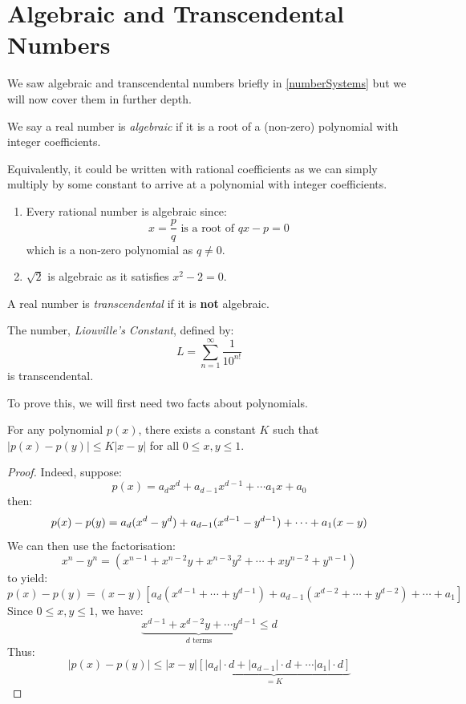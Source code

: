 \documentclass[../main.tex]{subfiles}
\begin{document}
\section{Algebraic and Transcendental Numbers}
We saw algebraic and transcendental numbers briefly in \cref{numberSystems} but we will now cover them in further depth.
\begin{definition}
  We say a real number is \textit{algebraic} if it is a root of a (non-zero) polynomial with integer coefficients.
\end{definition}
\begin{remark}[Note]
  Equivalently, it could be written with rational coefficients as we can simply multiply by some constant to arrive at a polynomial with integer coefficients.
\end{remark}
\begin{example}
  \begin{enumerate}
    \item Every rational number is algebraic since:
      \[
        x = \frac{p}{q} \text{ is a root of }qx - p = 0
      \]
      which is a non-zero polynomial as $q \neq 0$.
    \item $\sqrt{2}$ is algebraic as it satisfies $x^2 - 2= 0$.
  \end{enumerate}
\end{example}
\begin{definition}[Transcendental]
  A real number is \textit{transcendental} if it is \textbf{not} algebraic.
\end{definition}
\begin{theorem}[Liouville -- 1844]
  The number, \textit{Liouville's Constant}, defined by: \label{LNumber}
  \[
    L = \sum_{n=1}^{\infty} \frac{1}{10^{n!}}
  \]
  is transcendental.
\end{theorem}
To prove this, we will first need two facts about polynomials.
\begin{lemma}
  For any polynomial $p(x)$, there exists a constant $K$ such that $|p(x) - p(y)| \leq K|x - y|$ for all $0 \leq x, y \leq 1$. \label{fact1}
\end{lemma}
\begin{proof}
  Indeed, suppose:
  \[
    p(x) = a_d x^{d} + a_{d- 1}x^{d - 1} + \cdots a_1 x + a_0
  \]
  then:
  \[
    p(x) - p(y) = a_d(x^{d} - y^{d}) + a_{d - 1}(x^{d - 1} - y^{d - 1}) + \cdots + a_1(x - y) \\
  \]
  We can then use the factorisation:
  \[
    x^{n} - y^{n} = (x^{n-1} + x^{n-2}y + x^{n-3}y^2 + \cdots + xy^{n-2} + y^{n-1})
  \]
  to yield:
  \[
    p(x) - p(y) = (x - y)\left[a_d(x^{d - 1} + \cdots + y^{d - 1}) + a_{d-1}(x^{d - 2} + \cdots + y^{d- 2}) + \cdots + a_1\right]
  \]
  Since $0 \leq x, y \leq 1$, we have:
  \[
    \underbrace{x^{d - 1} + x^{d - 2}y + \cdots y^{d - 1}}_{d \text{ terms}} \leq d
  \]
  Thus:
  \[
    |p(x) - p(y)| \leq |x - y|\underbrace{[|a_d|\cdot d + |a_{d - 1}| \cdot d + \cdots |a_1| \cdot d]}_{= K}
  \]
\end{proof}
\end{document}
